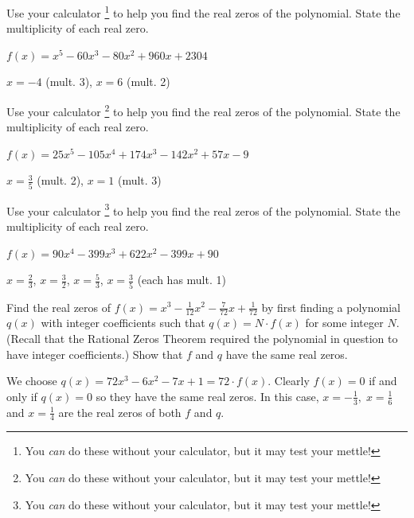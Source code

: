 \documentclass{ximera}
\begin{document}
\begin{problem}\label{realzeroswcalcfirst}
Use your calculator \footnote{You \textit{can} do these without your calculator, but it may test your mettle!} to help you find the real zeros of the polynomial.  State the multiplicity of each real zero.

$f(x) = x^{5} - 60x^{3} - 80x^{2} + 960x + 2304$

\begin{solution}
 $x = -4$ (mult. 3), $x = 6$ (mult. 2)
\end{solution}

\end{problem}

\begin{problem}
Use your calculator \footnote{You \textit{can} do these without your calculator, but it may test your mettle!} to help you find the real zeros of the polynomial.  State the multiplicity of each real zero.

$f(x) = 25x^{5} - 105x^{4} + 174x^{3} - 142x^{2} + 57x - 9$

\begin{solution}
$x = \frac{3}{5}$ (mult. 2), $x = 1$ (mult. 3)
\end{solution}

\end{problem}

\begin{problem}\label{realzeroswcalclast}
Use your calculator \footnote{You \textit{can} do these without your calculator, but it may test your mettle!} to help you find the real zeros of the polynomial.  State the multiplicity of each real zero.

$f(x) = 90x^{4} - 399x^{3} + 622x^{2} - 399x + 90$

\begin{solution}
$x = \frac{2}{3}$, $x = \frac{3}{2}$, $x = \frac{5}{3}$, $x = \frac{3}{5}$ (each has mult. 1)
\end{solution}
\end{problem}

\begin{problem}
Find the real zeros of $f(x) = x^{3} - \frac{1}{12}x^{2} - \frac{7}{72}x + \frac{1}{72}$ by first finding a polynomial $q(x)$ with integer coefficients such that $q(x) = N \cdot f(x)$ for some integer $N$.  (Recall that the Rational Zeros Theorem required the polynomial in question to have integer coefficients.) Show that $f$ and $q$ have the same real zeros.

\begin{solution}
We choose $q(x) = 72x^{3} - 6x^{2} - 7x + 1 = 72 \cdot f(x)$.  Clearly $f(x) = 0$ if and only if $q(x) = 0$ so they have the same real zeros.  In this case, $x = -\frac{1}{3}, \; x = \frac{1}{6} \;$ and $x = \frac{1}{4}$ are the real zeros of both $f$ and $q$.
\end{solution}
\end{problem}
\end{document}
